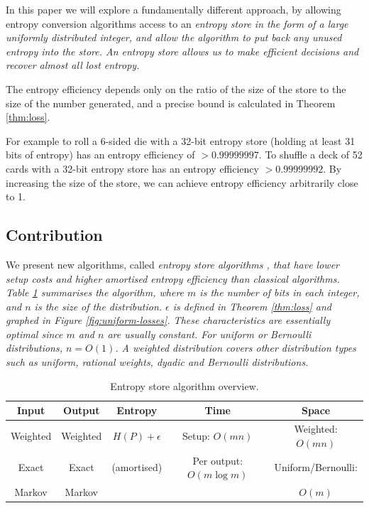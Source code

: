 \documentclass[12pt]{article}
\begin{document}
In this paper we will explore a fundamentally different approach, by allowing entropy conversion algorithms access to an \em entropy store \em in the form of a large uniformly distributed integer, and allow the algorithm to put back any unused entropy into the store. An entropy store allows us to make efficient decisions and recover almost all lost entropy.

The entropy efficiency depends only on the ratio of the size of the store to the size of the number generated, and a precise bound is calculated in Theorem \ref{thm:loss}. 

For example to roll a 6-sided die with a 32-bit entropy store (holding at least 31 bits of entropy) has an entropy efficiency of $>0.99999997$. To shuffle a deck of 52 cards with a 32-bit entropy store has an entropy efficiency $>0.99999992$. By increasing the size of the store, we can achieve entropy efficiency arbitrarily close to 1.


\subsection {Contribution}

We present new algorithms, called \em entropy store algorithms \em, that have lower setup costs and higher amortised entropy efficiency than classical algorithms. Table \ref{tab:entropy-store} summarises the algorithm, where $m$ is the number of bits in each integer, and $n$ is the size of the distribution. $\epsilon$ is defined in Theorem \ref{thm:loss} and graphed in Figure \ref{fig:uniform-losses}. These characteristics are essentially optimal since $m$ and $n$ are usually constant.  For uniform or Bernoulli distributions, $n=O(1)$. A weighted distribution covers other distribution types such as uniform, rational weights, dyadic and Bernoulli distributions.

\begin{table}[h!]
\centering
\begin{tabular}{|c|c|c|c|c|}
\hline
Input & Output & Entropy & Time & Space \\
\hline
Weighted & Weighted & $H(P)+\epsilon$ & Setup: $O(mn)$ & Weighted: $O(mn)$ \\
Exact & Exact & (amortised) & Per output: $O(m \log m)$  &  Uniform/Bernoulli: \\
Markov & Markov &  &   & $O(m)$  \\
\hline
\end{tabular}
\caption{Entropy store algorithm overview.}
    \label{tab:entropy-store}
\end{table}
\end{document}
